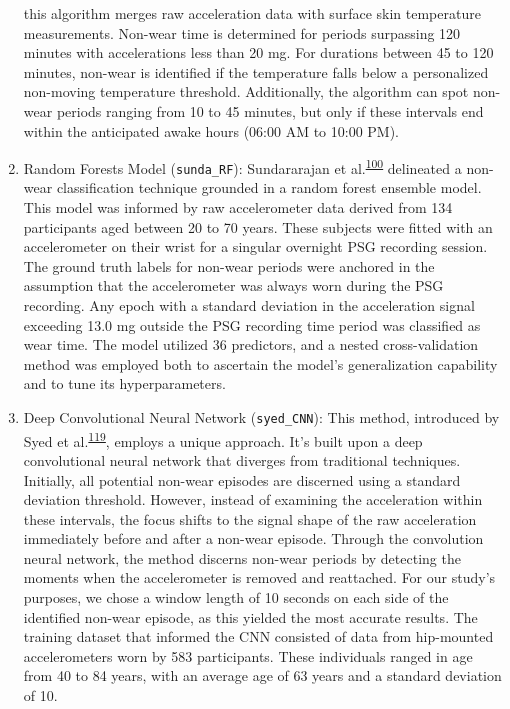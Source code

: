 \documentclass[
  10pt,
]{scrbook}
\begin{document}
\begin{enumerate}
  this algorithm merges raw acceleration data with surface skin
  temperature measurements. Non-wear time is determined for periods
  surpassing 120 minutes with accelerations less than 20 mg. For
  durations between 45 to 120 minutes, non-wear is identified if the
  temperature falls below a personalized non-moving temperature
  threshold. Additionally, the algorithm can spot non-wear periods
  ranging from 10 to 45 minutes, but only if these intervals end within
  the anticipated awake hours (06:00 AM to 10:00 PM).
\item
  Random Forests Model (\texttt{sunda\_RF}): Sundararajan et
  al.\textsuperscript{\protect\hyperlink{ref-sundararajan_sleep_2021}{100}}
  delineated a non-wear classification technique grounded in a random
  forest ensemble model. This model was informed by raw accelerometer
  data derived from 134 participants aged between 20 to 70 years. These
  subjects were fitted with an accelerometer on their wrist for a
  singular overnight PSG recording session. The ground truth labels for
  non-wear periods were anchored in the assumption that the
  accelerometer was always worn during the PSG recording. Any epoch with
  a standard deviation in the acceleration signal exceeding 13.0 mg
  outside the PSG recording time period was classified as wear time. The
  model utilized 36 predictors, and a nested cross-validation method was
  employed both to ascertain the model's generalization capability and
  to tune its hyperparameters.
\item
  Deep Convolutional Neural Network (\texttt{syed\_CNN}): This method,
  introduced by Syed et
  al.\textsuperscript{\protect\hyperlink{ref-syed_novel_2021}{119}},
  employs a unique approach. It's built upon a deep convolutional neural
  network that diverges from traditional techniques. Initially, all
  potential non-wear episodes are discerned using a standard deviation
  threshold. However, instead of examining the acceleration within these
  intervals, the focus shifts to the signal shape of the raw
  acceleration immediately before and after a non-wear episode. Through
  the convolution neural network, the method discerns non-wear periods
  by detecting the moments when the accelerometer is removed and
  reattached. For our study's purposes, we chose a window length of 10
  seconds on each side of the identified non-wear episode, as this
  yielded the most accurate results. The training dataset that informed
  the CNN consisted of data from hip-mounted accelerometers worn by 583
  participants. These individuals ranged in age from 40 to 84 years,
  with an average age of 63 years and a standard deviation of 10.
\end{enumerate}
\end{document}
